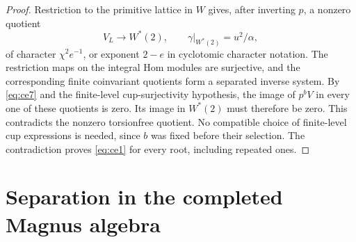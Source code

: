 \documentclass[11pt]{article}
\theoremstyle{definition}
\numberwithin{equation}{section}
\begin{document}
\begin{proof}
Restriction to the primitive lattice in $W$ gives, after inverting
$p$, a nonzero quotient
\begin{equation}
 V_L\longrightarrow W^*(2),\qquad
 \gamma|_{W^*(2)}=u^2/\alpha,
\end{equation}
of character $\chi^2e^{-1}$, or exponent $2-e$ in cyclotomic
character notation. The restriction maps on the integral Hom
modules are surjective, and the corresponding finite coinvariant
quotients form a separated inverse system. By \eqref{eq:ce7} and the
finite-level cup-surjectivity hypothesis, the image of $p^bV$ in
every one of these quotients is zero. Its image in $W^*(2)$ must
therefore be zero. This contradicts the nonzero torsionfree
quotient. No compatible choice of finite-level cup expressions is
needed, since $b$ was fixed before their selection. The contradiction
proves \eqref{eq:ce1} for every root, including repeated ones.
\end{proof}

\section{Separation in the completed Magnus algebra}
\end{document}
